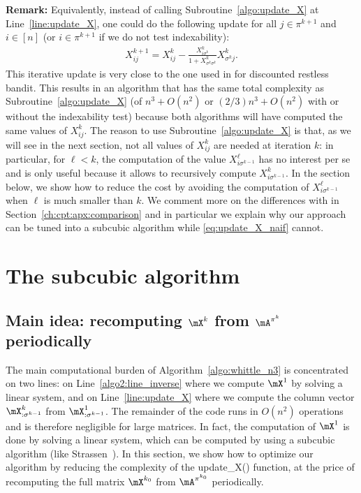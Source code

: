 \textbf{Remark:} Equivalently, instead of calling Subroutine~\ref{algo:update_X} at Line~\ref{line:update_X}, one could do the following update for all $j\in\pi^{k+1}$ and $i\in[n]$ (or $i\in\pi^{k+1}$ if we do not test indexability):
\begin{align}
    X_{ij}^{k+1} = X_{ij}^{k} -\displaystyle\frac{X^{k}_{i\sigma^{k}}}{1+X^{k}_{\sigma^{k}\sigma^{k}}}X^{k}_{\sigma^{k}j}. \label{eq:update_X_naif}
\end{align}
This iterative update is very close to the one used in \cite{akbarzadeh2020conditions,nino2020fast} for discounted restless bandit. This results in an algorithm that has the same total complexity as Subroutine~\ref{algo:update_X} (of $n^3+O(n^2)$ or $(2/3)n^3+O(n^2)$ with or without the indexability test) because both algorithms will have computed the same values of $X^{k}_{ij}$. The reason to use Subroutine~\ref{algo:update_X} is that, as we will see in the next section, not all values of $X^{k}_{ij}$ are needed at iteration $k$: in particular, for $\ell<k$, the computation of the value $X^\ell_{i\sigma^{k-1}}$ has no interest per se and is only useful because it allows to recursively compute $X^{k}_{i\sigma^{k-1}}$. In the section below, we show how to reduce the cost by avoiding the computation of $X^\ell_{i\sigma^{k-1}}$ when $\ell$ is much smaller than $k$. We comment more on the differences with \cite{akbarzadeh2020conditions,nino2020fast} in Section~\ref{ch:cpt:apx:comparison} and in particular we explain why our approach can be tuned into a subcubic algorithm while \eqref{eq:update_X_naif} cannot.

\section{The subcubic algorithm}
\label{sec:subcubic algorithm}

\subsection{Main idea: recomputing \texorpdfstring{$\mX^{k}$ from $\mA^{\pi^k}$}{Xk from Apik} periodically}

The main computational burden of Algorithm~\ref{algo:whittle_n3} is concentrated on two lines: on Line~\ref{algo2:line_inverse} where we compute $\mX^1$ by solving a linear system, and on Line~\ref{line:update_X} where we compute the column vector $\mX^{k}_{:\sigma^{k-1}}$ from $\mX^1_{: \sigma^{k-1}}$. The remainder of the code runs in $O(n^2)$ operations and is therefore negligible for large matrices. In fact, the computation of $\mX^1$ is done by solving a linear system, which can be computed by using a subcubic algorithm (like Strassen~\cite{strassen1969gaussian}). In this section, we show how to optimize our algorithm by reducing the complexity of the update\_X() function, at the price of recomputing the full matrix $\mX^{k_0}$ from $\mA^{\pi^{k_0}}$ periodically.

